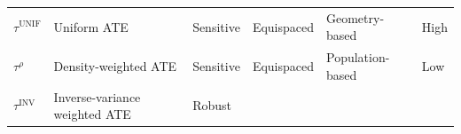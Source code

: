 \documentclass[letter]{article}
\newcommand{\unifavg}{\tau^{\mathrm{UNIF}}}
\newcommand{\invvar}{\tau^{\mathrm{INV}}}
\newcommand{\taurho}{\tau^{\rho}}
\begin{document}
\begin{longtable}[]{@{}llllll@{}}
\endhead
\begin{minipage}[t]{0.09\columnwidth}\raggedright\strut
\(\unifavg\)\strut
\end{minipage} & \begin{minipage}[t]{0.25\columnwidth}\raggedright\strut
Uniform ATE\strut
\end{minipage} & \begin{minipage}[t]{0.13\columnwidth}\raggedright\strut
Sensitive\strut
\end{minipage} & \begin{minipage}[t]{0.13\columnwidth}\raggedright\strut
Equispaced\strut
\end{minipage} & \begin{minipage}[t]{0.15\columnwidth}\raggedright\strut
Geometry-based\strut
\end{minipage} & \begin{minipage}[t]{0.08\columnwidth}\raggedright\strut
High\strut
\end{minipage}\tabularnewline
\begin{minipage}[t]{0.09\columnwidth}\raggedright\strut
\(\taurho\)\strut
\end{minipage} & \begin{minipage}[t]{0.25\columnwidth}\raggedright\strut
Density-weighted ATE\strut
\end{minipage} & \begin{minipage}[t]{0.13\columnwidth}\raggedright\strut
Sensitive\strut
\end{minipage} & \begin{minipage}[t]{0.13\columnwidth}\raggedright\strut
Equispaced\strut
\end{minipage} & \begin{minipage}[t]{0.15\columnwidth}\raggedright\strut
Population-based\strut
\end{minipage} & \begin{minipage}[t]{0.08\columnwidth}\raggedright\strut
Low\strut
\end{minipage}\tabularnewline
\begin{minipage}[t]{0.09\columnwidth}\raggedright\strut
\(\invvar\)\strut
\end{minipage} & \begin{minipage}[t]{0.25\columnwidth}\raggedright\strut
Inverse-variance weighted ATE\strut
\end{minipage} & \begin{minipage}[t]{0.13\columnwidth}\raggedright\strut
Robust\strut
\end{minipage} & \begin{minipage}[t]{0.13\columnwidth}\raggedright\strut

\end{minipage}
\end{longtable}
\end{document}
